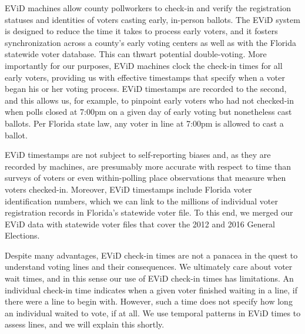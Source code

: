 \documentclass[12pt,titlepage]{article}
\begin{document}

EViD machines allow county pollworkers to check-in and verify the
registration statuses and identities of voters casting early,
in-person ballots. The EViD system is designed to reduce the time it
takes to process early voters, and it fosters synchronization across a
county's early voting centers as well as with the Florida statewide
voter database.  This can thwart potential double-voting.  More
importantly for our purposes, EViD machines clock the check-in times
for all early voters, providing us with effective timestamps that
specify when a voter began his or her voting process. EViD timestamps
are recorded to the second, and this allows us, for example, to
pinpoint early voters who had not checked-in when polls closed at
7:00pm on a given day of early voting but nonetheless cast ballots.
Per Florida state law, any voter in line at 7:00pm is allowed to cast
a ballot.


EViD timestamps are not subject to self-reporting biases and, as they
are recorded by machines, are presumably more accurate with respect to
time than surveys of voters or even within-polling place observations
that measure when voters checked-in.  Moreover, EViD timestamps
include Florida voter identification numbers, which we can link to the
millions of individual voter registration records in Florida's
statewide voter file.  To this end, we merged our EViD data with
statewide voter files that cover the 2012 and 2016 General
Elections.  %

Despite many advantages, EViD check-in times are not a panacea in the
quest to understand voting lines and their consequences.  We
ultimately care about voter wait times, and in this sense our use of
EViD check-in times has limitations.  An individual check-in time
indicates when a given voter finished waiting in a line, if there were
a line to begin with.  However, such a time does not specify how long
an individual waited to vote, if at all.  We use temporal patterns in EViD
times to assess lines, and we will explain this shortly.

\end{document}
